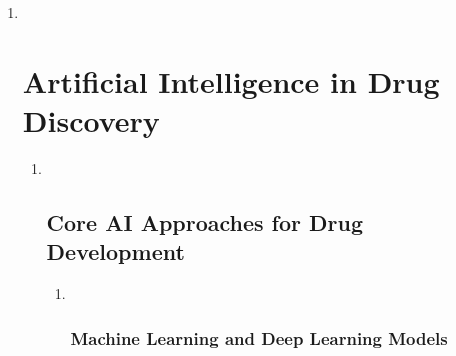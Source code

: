 \documentclass[
]{article}
\begin{document}
\begin{enumerate}
\def\labelenumi{\arabic{enumi}.}
\setcounter{enumi}{2}
\item ~
  \hypertarget{artificial-intelligence-in-drug-discovery}{%
  \section{Artificial Intelligence in Drug
  Discovery}\label{artificial-intelligence-in-drug-discovery}}

  \begin{enumerate}
  \def\labelenumii{\arabic{enumii}.}
  \item ~
    \hypertarget{core-ai-approaches-for-drug-development}{%
    \subsection{Core AI Approaches for Drug
    Development}\label{core-ai-approaches-for-drug-development}}

    \begin{enumerate}
    \def\labelenumiii{\arabic{enumiii}.}
    \item ~
      \hypertarget{machine-learning-and-deep-learning-models}{%
      \subsubsection{Machine Learning and Deep Learning
      Models}\label{machine-learning-and-deep-learning-models}}
    \end{enumerate}
  \end{enumerate}
\end{enumerate}
\end{document}
